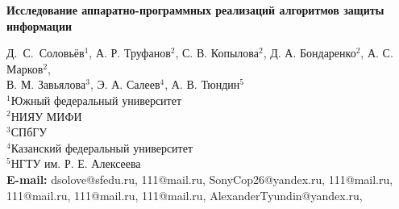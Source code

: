 \documentclass[a4paper,12pt]{article}
\def\titleK#1{\begin{center}{\Large\textbf{#1}}\end{center}}
\def\authorK#1{\begin{center}{#1}\end{center}}
\theoremstyle{definition}
\begin{document}
\titleK{Исследование аппаратно-программных реализаций алгоритмов защиты информации}

\authorK{Д.~С.~Соловьёв$^{1}$, А. Р. Труфанов$^{2}$, С. В. Копылова$^{2}$, Д. А. Бондаренко$^{2}$,  А. С. Марков$^{2}$, 
\\В. М. Завьялова$^{3}$, Э. А. Салеев$^{4}$, А. В. Тюндин$^{5}$
\\$^{1}$Южный федеральный университет 
\\$^{2}$НИЯУ МИФИ
\\$^{3}$СПбГУ
\\$^{4}$Казанский федеральный университет
\\$^{5}$НГТУ им. Р. Е. Алексеева
\\{\bf E-mail:} dsolove@sfedu.ru, 111@mail.ru,  SonyCop26@yandex.ru, 111@mail.ru, 111@mail.ru, 111@mail.ru, 111@mail.ru, AlexanderTyundin@yandex.ru,}

\begin{abstract}
      Аннотация. (Ждем ответ от Яковлева А.А.)\\
\\{\bf Ключевые слова:} \textit{реверс-инжиниринг, статический и динамический анализ, фреймворк Qt, поточное шифрование, антиотладка, обход защиты, информационная безопасность. (пересмотреть ключевые слова)} 
\end{abstract}
\end{document}
